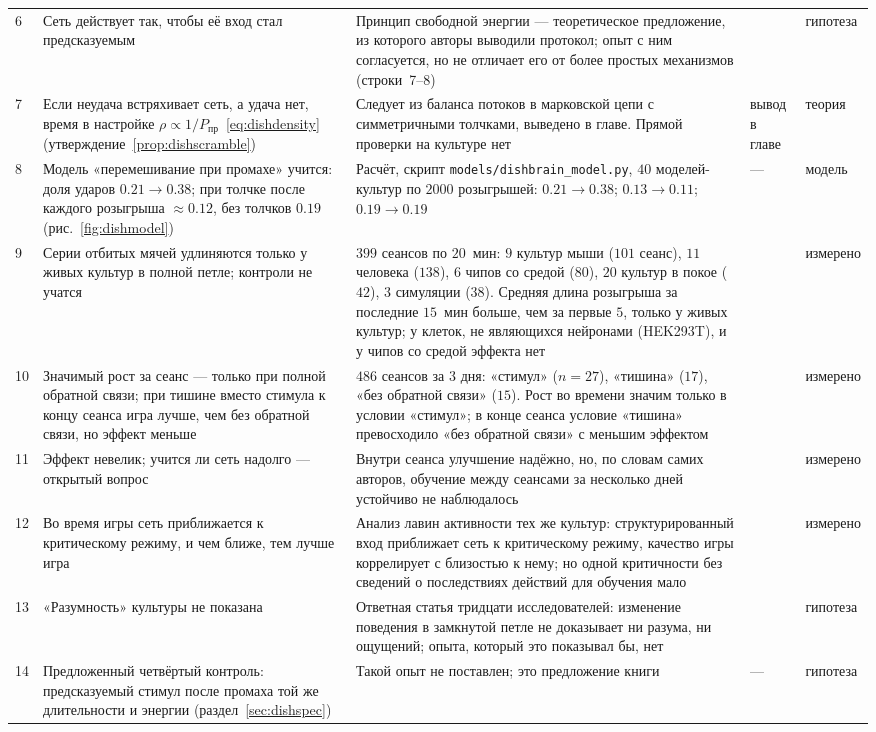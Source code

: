 {\begin{longtable}{>{\raggedright}p{0.5cm}>{\raggedright}p{4.0cm}>{\raggedright}p{5.6cm}>{\raggedright}p{2.3cm}>{\raggedright\arraybackslash}p{1.7cm}}
6 & Сеть действует так, чтобы её вход стал предсказуемым & Принцип свободной энергии --- теоретическое предложение, из которого авторы выводили протокол; опыт с ним согласуется, но не отличает его от более простых механизмов (строки~7--8) & \cite{Friston2010,Kagan2022} & гипотеза \\
7 & Если неудача встряхивает сеть, а удача нет, время в настройке $\rho\propto1/P_{\text{пр}}$~\eqref{eq:dishdensity} (утверждение~\ref{prop:dishscramble}) & Следует из баланса потоков в марковской цепи с симметричными толчками, выведено в главе. Прямой проверки на культуре нет & вывод в главе & теория \\
8 & Модель «перемешивание при промахе» учится: доля ударов $0.21\to0.38$; при толчке после каждого розыгрыша $\approx0.12$, без толчков $0.19$ (рис.~\ref{fig:dishmodel}) & Расчёт, скрипт \texttt{models/dishbrain\_model.py}, $40$ моделей-культур по $2000$ розыгрышей: $0.21\to0.38$; $0.13\to0.11$; $0.19\to0.19$ & --- & модель \\
9 & Серии отбитых мячей удлиняются только у живых культур в полной петле; контроли не учатся & $399$ сеансов по $20$~мин: $9$ культур мыши ($101$ сеанс), $11$ человека ($138$), $6$ чипов со средой ($80$), $20$ культур в покое ($42$), $3$ симуляции ($38$). Средняя длина розыгрыша за последние $15$~мин больше, чем за первые $5$, только у живых культур; у клеток, не являющихся нейронами (HEK293T), и у чипов со средой эффекта нет & \cite{Kagan2022} & измерено \\
10 & Значимый рост за сеанс --- только при полной обратной связи; при тишине вместо стимула к концу сеанса игра лучше, чем без обратной связи, но эффект меньше & $486$ сеансов за $3$ дня: «стимул» ($n=27$), «тишина» ($17$), «без обратной связи» ($15$). Рост во времени значим только в условии «стимул»; в конце сеанса условие «тишина» превосходило «без обратной связи» с меньшим эффектом & \cite{Kagan2022} & измерено \\
11 & Эффект невелик; учится ли сеть надолго --- открытый вопрос & Внутри сеанса улучшение надёжно, но, по словам самих авторов, обучение между сеансами за несколько дней устойчиво не наблюдалось & \cite{Kagan2022} & измерено \\
12 & Во время игры сеть приближается к критическому режиму, и чем ближе, тем лучше игра & Анализ лавин активности тех же культур: структурированный вход приближает сеть к критическому режиму, качество игры коррелирует с близостью к нему; но одной критичности без сведений о последствиях действий для обучения мало & \cite{Habibollahi2023} & измерено \\
13 & «Разумность» культуры не показана & Ответная статья тридцати исследователей: изменение поведения в замкнутой петле не доказывает ни разума, ни ощущений; опыта, который это показывал бы, нет & \cite{Balci2023} & гипотеза \\
14 & Предложенный четвёртый контроль: предсказуемый стимул после промаха той же длительности и энергии (раздел~\ref{sec:dishspec}) & Такой опыт не поставлен; это предложение книги & --- & гипотеза \\
\bottomrule
\end{longtable}}
